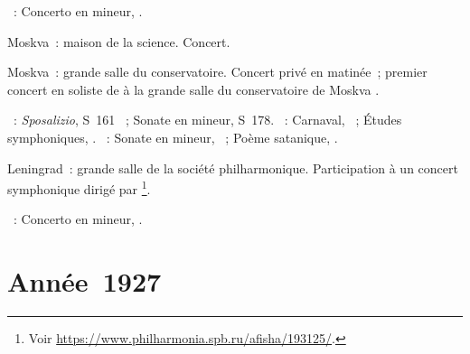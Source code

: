 \begin{description}
 \textsc{\Glazounov{}}~: Concerto en \kF mineur, .
 \item[\DateWithWeekDay{1926-11-17}]
 Moskva~: maison de la science.
 Concert.
 \item[\DateWithWeekDay{1926-11-19}]
 Moskva~: grande salle du conservatoire.
 Concert privé en matinée~; premier concert en soliste de \VSofronitsky{} à
 la grande salle du conservatoire de Moskva
 \citep[voir][p.~423-424]{Milshteyn82a}.

 \textsc{\Liszt{}}~: \emph{Sposalizio}, S~161 ~; Sonate en \kB
 mineur, S~178.
 \textsc{\Schumann{}}~: Carnaval, ~; Études symphoniques, .
 \textsc{\Scriabine{}}~: Sonate en \kF \Sharp mineur, ~; Poème
 satanique, .
 \item[\DateWithWeekDay{1926-12-19}]
 Leningrad~: grande salle de la société philharmonique.
 Participation à un concert symphonique dirigé par \NMalko{}%
 \footnote{Voir \href{https://www.philharmonia.spb.ru/afisha/193125/}%
 {https://www.philharmonia.spb.ru/afisha/193125/}.}.

 \textsc{\Scriabine{}}~: Concerto en \kF \Sharp mineur, .
\end{description}

\section{Année~1927}

